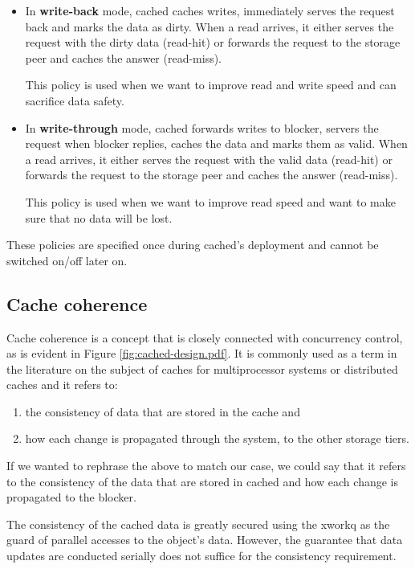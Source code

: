 \begin{itemize}
	\item
		In \textbf{write-back} mode, cached caches writes, immediately 
		serves the request back and marks the data as dirty. When a read 
		arrives, it either serves the request with the dirty data 
		(read-hit) or forwards the request to the storage peer and 
		caches the answer (read-miss).

		This policy is used when we want to improve read and write speed 
		and can sacrifice data safety.
	\item
		In \textbf{write-through} mode, cached forwards writes to 
		blocker, servers the request when blocker replies, caches the 
		data and marks them as valid.  When a read arrives, it either 
		serves the request with the valid data (read-hit) or forwards 
		the request to the storage peer and caches the answer 
		(read-miss).

		This policy is used when we want to improve read speed and want 
		to make sure that no data will be lost.
\end{itemize}	

These policies are specified once during cached's deployment and cannot be 
switched on/off later on.

\subsection{Cache coherence}

Cache coherence is a concept that is closely connected with concurrency 
control, as is evident in Figure \ref{fig:cached-design.pdf}. It is commonly 
used as a term in the literature on the subject of caches for multiprocessor 
systems or distributed caches and it refers to:

\begin{enumerate}
	\item the consistency of data that are stored in the cache and
	\item how each change is propagated through the system, to the other 
		storage tiers.\label{list:second-coherence}
\end{enumerate}

If we wanted to rephrase the above to match our case, we could say that it 
refers to the consistency of the data that are stored in cached and how each 
change is propagated to the blocker.

The consistency of the cached data is greatly secured using the xworkq as the 
guard of parallel accesses to the object's data. However, the guarantee that 
data updates are conducted serially does not suffice for the consistency 
requirement.

